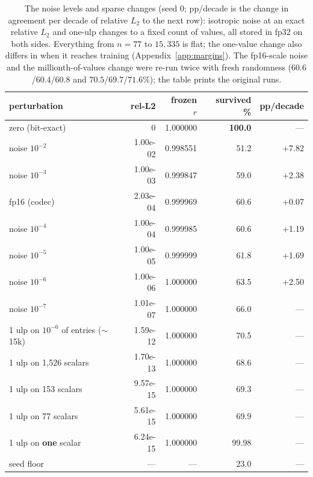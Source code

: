 \begin{table}[htbp]
\caption{The noise levels and sparse changes (seed 0; pp/decade is the change in agreement per decade of relative $L_2$ to the next row): isotropic noise at an exact relative $L_2$ and one-ulp changes to a fixed count of values, all stored in fp32 on both sides. Everything from $n=77$ to $15{,}335$ is flat; the one-value change also differs in when it reaches training (Appendix~\ref{app:margins}). The fp16-scale noise and the millionth-of-values change were re-run twice with fresh randomness ($60.6$/$60.4$/$60.8$ and $70.5$/$69.7$/$71.6\%$); the table prints the original runs.}
\label{tab:dose}
\centering\small
\begin{tabular}{lrrrr}
\toprule
perturbation & rel-L2 & frozen $r$ & survived \% & pp/decade \\
\midrule
zero (bit-exact) & 0 & 1.000000 & \textbf{100.0} & --- \\
noise $10^{-2}$ & 1.00e-02 & 0.998551 & 51.2 & +7.82 \\
noise $10^{-3}$ & 1.00e-03 & 0.999847 & 59.0 & +2.38 \\
fp16 (codec) & 2.03e-04 & 0.999969 & 60.6 & +0.07 \\
noise $10^{-4}$ & 1.00e-04 & 0.999985 & 60.6 & +1.19 \\
noise $10^{-5}$ & 1.00e-05 & 0.999999 & 61.8 & +1.69 \\
noise $10^{-6}$ & 1.00e-06 & 1.000000 & 63.5 & +2.50 \\
noise $10^{-7}$ & 1.01e-07 & 1.000000 & 66.0 & --- \\
1 ulp on $10^{-6}$ of entries ($\sim$15k) & 1.59e-12 & 1.000000 & 70.5 & --- \\
1 ulp on 1{,}526 scalars & 1.70e-13 & 1.000000 & 68.6 & --- \\
1 ulp on 153 scalars & 9.57e-15 & 1.000000 & 69.3 & --- \\
1 ulp on 77 scalars & 5.61e-15 & 1.000000 & 69.9 & --- \\
1 ulp on \textbf{one} scalar & 6.24e-15 & 1.000000 & 99.98 & --- \\
\midrule
seed floor & --- & --- & 23.0 & --- \\
\bottomrule
\end{tabular}
\end{table}

